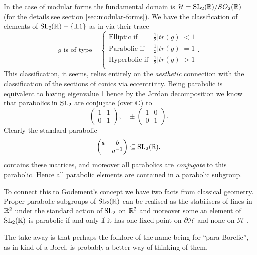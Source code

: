 \begin{Remark}
    In the case of modular forms the fundamental domain is \(\mathcal{H} = \SL_2(\R)/SO_2(\R)\) (for the details see section \ref{sec:modular-forms}). We have the classification of elements of  \(\SL_2(\R) -\{\pm 1\}\) as in \cite[3.5]{borelAutomorphicFormsSL21997} via their trace
    \[g\text{ is of type } \;\;\; 
    \begin{cases}
        \text{Elliptic if} & \frac{1}{2}|tr(g)| < 1 \\
        \text{Parabolic if} & \frac{1}{2}|tr(g)| = 1 \\
        \text{Hyperbolic if} & \frac{1}{2}|tr(g)| > 1 \\
    \end{cases}
    .\]
    This classification, it seems, relies entirely on the \textit{aesthetic} connection with the classification of the sections of conics via eccentricity. Being parabolic is equivalent to having eigenvalue 1 hence by the Jordan decomposition we know that parabolics in \(\operatorname{SL}_2\) are conjugate (over \(\C\)) to 
    \[\begin{pmatrix}
        1 & 1\\
        0 & 1
    \end{pmatrix},\;\;\; \pm\begin{pmatrix}
        1 & 0\\
        0 & 1
    \end{pmatrix}.\]
    Clearly the standard parabolic 
    \[\begin{pmatrix}
        a & b \\
         & a\inv
    \end{pmatrix} \subseteq \SL_2(\R),\]
    contains these matrices, and moreover all parabolics are \textit{conjugate} to this parabolic. Hence all parabolic elements are contained in a parabolic subgroup. 

    To connect this to Godement's concept we have two facts from classical geometry. Proper parabolic subgroups of \(\SL_2(\R)\) can be realised as the stabilisers of lines in \(\R^2\) under the standard action of \(\operatorname{SL}_2\) on \(\R^2\) \cite[2.6]{borelAutomorphicFormsSL21997} and moreover some an element of \(\SL_2(\R)\) is parabolic if and only if it has one fixed point on \(\partial\bar{\mathcal{H}}\) and none on \(\mathcal{H}\) \cite[3.5]{borelAutomorphicFormsSL21997}. 

    The take away is that perhaps the folklore of the name being for ``para-Borelic'', as in kind of a Borel, is probably a better way of thinking of them.
\end{Remark}

